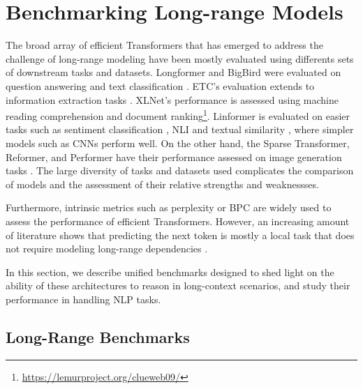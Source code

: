 

\section{Benchmarking Long-range Models}

The broad array of efficient Transformers that has emerged to address the challenge of long-range modeling have been mostly evaluated using differents sets of downstream tasks and datasets. Longformer and BigBird were evaluated on question answering \citep{yang2018hotpotqa, welbl2018constructing} and text classification \citep{maas2011learning, kiesel2019semeval}. \ac{ETC}'s evaluation extends to information extraction tasks \citep{xiong2019open}. XLNet's performance is assessed using machine reading comprehension \citep{lai2017race} and document ranking\footnote{\url{https://lemurproject.org/clueweb09/}}. Linformer is evaluated on easier tasks such as sentiment classification \citep{maas2011learning, socher2013recursive}, \ac{NLI} \citep{wang2018glue} and textual similarity \citep{wang2017bilateral}, where simpler models such as \acp{CNN} perform well. On the other hand, the Sparse Transformer, Reformer, and Performer have their performance assessed on image generation tasks \citep{parmar2018image}. The large diversity of tasks and datasets used complicates the comparison of models and the assessment of their relative strengths and weaknessses. 

Furthermore, intrinsic metrics such as perplexity or \ac{BPC} are widely used to assess the performance of efficient Transformers. However, an increasing amount of literature shows that predicting the next token is mostly a local task that does not require modeling long-range dependencies \citep{khandelwal2018sharp, sun2021long}. 

In this section, we describe unified benchmarks designed to shed light on the ability of these architectures to reason in long-context scenarios, and study their performance in handling \ac{NLP} tasks.

\subsection{Long-Range Benchmarks}

